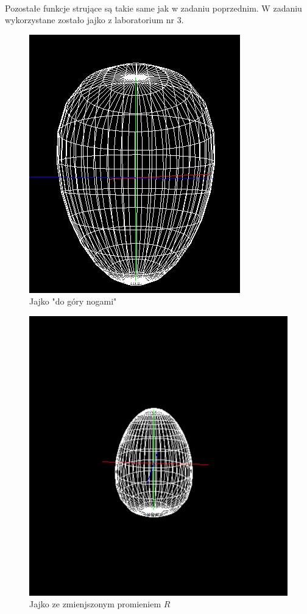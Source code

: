 \documentclass[wide,a4paper,titlepage,12pt] {article}
\begin{document}
\paragraph{}
Pozostałe funkcje strujące są takie same jak w zadaniu poprzednim. W zadaniu wykorzystane zostało jajko z laboratorium nr 3.
\begin{figure}[htbp]
	\begin{center}
        	 \includegraphics[scale=1]{j1.PNG}
	\caption{Jajko "do góry nogami"}
   	  \end{center}
\end{figure}
\begin{figure}[htbp]
	\begin{center}
        	 \includegraphics[scale=0.7]{j2.PNG}
	\caption{Jajko ze zmienjszonym promieniem $R$}
   	  \end{center}
\end{figure}
\end{document}
